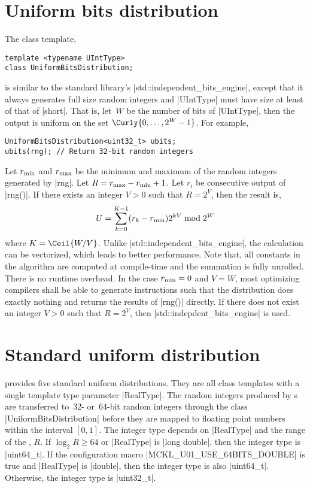 \section{Uniform bits distribution}
\label{sec:Uniform bits distribution}

The class template,
\begin{verbatim}
template <typename UIntType>
class UniformBitsDistribution;
\end{verbatim}
is similar to the standard library's |std::independent_bits_engine|, except
that it always generates full size random integers and |UIntType| must have
size at least of that of |short|. That is, let~$W$ be the number of bits of
|UIntType|, then the output is uniform on the set $\Curly{0,\dots,2^W - 1}$.
For example,
\begin{verbatim}
UniformBitsDistribution<uint32_t> ubits;
ubits(rng); // Return 32-bit random integers
\end{verbatim}
Let $r_{\mathrm{min}}$ and $r_{\mathrm{max}}$ be the minimum and maximum of the random integers
generated by |rng|. Let $R = r_{\mathrm{max}} - r_{\mathrm{min}} + 1$. Let $r_i$ be consecutive
output of |rng()|. If there exists an integer $V > 0$ such that $R = 2^V$, then
the result is,
\begin{equation*}
  U = \sum_{k = 0}^{K - 1} (r_k - r_{\mathrm{min}}) 2^{kV} \bmod 2^W
\end{equation*}
where $K = \Ceil{W / V}$. Unlike |std::independent_bits_engine|, the
calculation can be vectorized, which leads to better performance. Note that,
all constants in the algorithm are computed at compile-time and the summation
is fully unrolled. There is no runtime overhead. In the case $r_{\mathrm{min}} = 0$ and $V
= W$, most optimizing compilers shall be able to generate instructions such
that the distribution does exactly nothing and returns the results of |rng()|
directly. If there does not exist an integer $V > 0$ such that $R = 2^V$, then
|std::indepdent_bits_engine| is used.

\section{Standard uniform distribution}
\label{sec:Standard uniform distribution}

\mckl provides five standard uniform distributions. They are all class
templates with a single template type parameter |RealType|. The random integers
produced by \rng{}s are transferred to~32- or~64-bit random integers through
the class |UniformBitsDistribution| before they are mapped to floating point
numbers within the interval $[0, 1]$. The integer type depends on |RealType|
and the range of the \rng{}, $R$. If $\log_2 R \ge 64$ or |RealType| is
|long double|, then the integer type is |uint64_t|. If the configuration macro
|MCKL_U01_USE_64BITS_DOUBLE| is true and |RealType| is |double|, then the
integer type is also |uint64_t|. Otherwise, the integer type is |uint32_t|.

